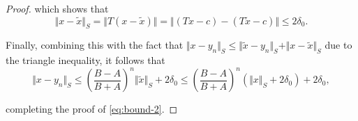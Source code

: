 \documentclass[10pt,a4paper]{amsart}
\begin{document}
\begin{proof}
\noindent
which shows that 
$$ \Vert x-\tilde{x}\Vert_{S} = \Vert T(x-\tilde{x})\Vert = \Vert (Tx-c)-(T\tilde{x}-c)\Vert \le 2\delta_{0}. $$ 

\noindent
Finally, combining this with the fact that $\Vert x-y_{n} \Vert_{S} \le \Vert \tilde{x}-y_{n}\Vert_{S} + \Vert x-\tilde{x}\Vert_{S}$ due to the triangle inequality, it follows that
$$ \Vert x-y_{n}\Vert_{S} \le \left ( \frac{B-A}{B+A} \right )^{n} \Vert \tilde{x} \Vert_{S} + 2 \delta_{0} \le \left ( \frac{B-A}{B+A} \right )^{n} \left ( \Vert x \Vert_{S} + 2\delta_{0} \right ) + 2 \delta_{0}, $$

\noindent
completing the proof of \eqref{eq:bound-2}.
\end{proof}
\end{document}
